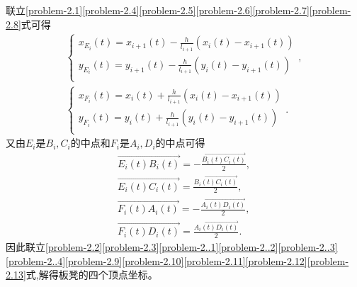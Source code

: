\documentclass[../main.tex]{subfiles}
\begin{document}
     联立\eqref{problem-2.1}\eqref{problem-2.4}\eqref{problem-2.5}\eqref{problem-2.6}\eqref{problem-2.7}\eqref{problem-2.8}式可得
     \begin{gather}
     \begin{cases}
     x_{E_i}\left( t \right) =x_{i+1}\left( t \right) -\frac{h}{l_{i+1}}\left( x_i\left( t \right) -x_{i+1}\left( t \right) \right)\\
     y_{E_i}\left( t \right) =y_{i+1}\left( t \right) -\frac{h}{l_{i+1}}\left( y_i\left( t \right) -y_{i+1}\left( t \right) \right)\\
     \end{cases},\label{problem-2.9}
     \\
     \begin{cases}
     x_{F_i}\left( t \right) =x_i\left( t \right) +\frac{h}{l_{i+1}}\left( x_i\left( t \right) -x_{i+1}\left( t \right) \right)\\
     y_{F_i}\left( t \right) =y_i\left( t \right) +\frac{h}{l_{i+1}}\left( y_i\left( t \right) -y_{i+1}\left( t \right) \right)\\
     \end{cases}.\label{problem-2.10}
     \end{gather}
     又由$E_i$是$B_i,C_{i}$的中点和$F_i$是$A_i,D_i$的中点可得
     \begin{gather}
     \overrightarrow{E_i\left( t \right) B_i\left( t \right) }=-\frac{\overrightarrow{B_i\left( t \right) C_i\left( t \right) }}{2},\label{problem-2.11}
     \\
     \overrightarrow{E_i\left( t \right) C_i\left( t \right) }=\frac{\overrightarrow{B_i\left( t \right) C_i\left( t \right) }}{2},\label{problem-2.12}
     \\
     \overrightarrow{F_i\left( t \right) A_i\left( t \right) }=-\frac{\overrightarrow{A_i\left( t \right) D_i\left( t \right) }}{2},\label{problem-2.13}
     \\
     \overrightarrow{F_i\left( t \right) D_i\left( t \right) }=\frac{\overrightarrow{A_i\left( t \right) D_i\left( t \right) }}{2}.   \label{problem-2.14} 
     \end{gather}
     因此联立\eqref{problem-2.2}\eqref{problem-2.3}\eqref{problem-2..1}\eqref{problem-2..2}\eqref{problem-2..3}\eqref{problem-2..4}\eqref{problem-2.9}\eqref{problem-2.10}\eqref{problem-2.11}\eqref{problem-2.12}\eqref{problem-2.13}式,解得板凳的四个顶点坐标。
\end{document}
